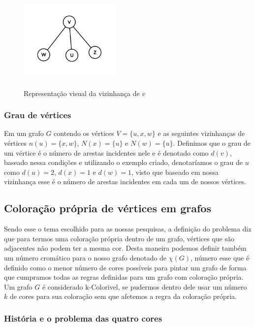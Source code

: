 \documentclass[12pt]{article}
\begin{document}
	\begin{figure}[!htb]
		\centering
		\includegraphics[width=5cm, height=5cm]{vizinhanca}
		\caption{Representação visual da vizinhança de $v$}    
	\end{figure}
	
	
	\subsubsection{Grau de vértices}
	Em um grafo $G$ contendo os vértices $V = \{u, x, w\}$ e as seguintes vizinhanças de vértices $n(u) = \{x, w\}$, $N(x) = \{u\}$ e $N(w) = \{u\}$.	
	Definimos que o grau de um vértice é o número de arestas incidentes nele e é denotado como $d(v)$, baseado nessa condições e utilizando o exemplo criado, denotaríamos o grau de $u$ como $d(u) = 2$, $d(x) = 1$ e $d(w) = 1$, visto que baseado em nossa vizinhança esse é o número de arestas incidentes em cada um de nossos vértices.
	
	\subsection{ Coloração própria de vértices em grafos}
	Sendo esse o tema escolhido para as nossas pesquisas, a definição do problema diz que para termos uma coloração própria dentro de um grafo, vértices que são adjacentes não podem ter a mesma cor. Desta maneira podemos definir também um número cromático para o nosso grafo denotado de $\chi(G)$, número esse que é definido como o menor número de cores possíveis para pintar um grafo de forma que cumpramos todas as regras definidas para um grafo com coloração própria.
	Um grafo $G$ é considerado k-Colorivel, se pudermos dentro dele usar um número $k$ de cores para sua coloração sem que afetemos a regra da coloração própria.
	
	\subsubsection{História e o problema das quatro cores}
	
\end{document}
